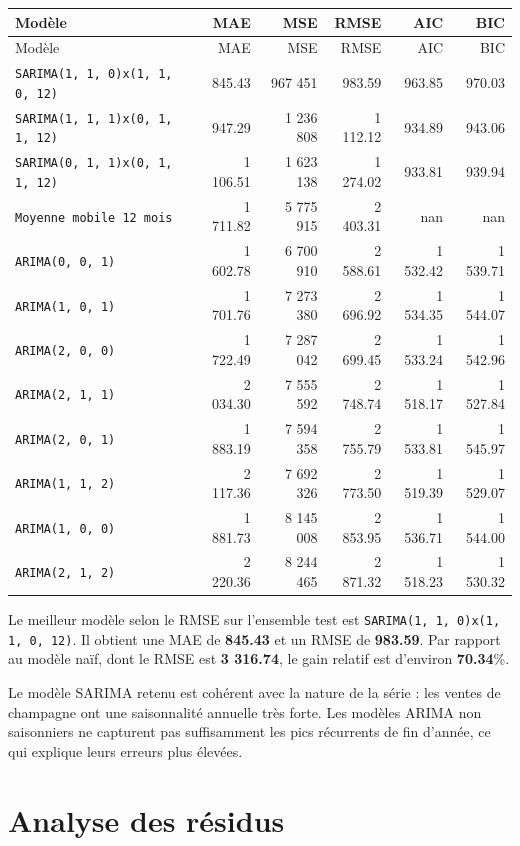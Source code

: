 \documentclass[12pt,a4paper]{report}
\begin{document}
\begin{longtable}{p{6.8cm}rrrrr}
\toprule
Modèle & MAE & MSE & RMSE & AIC & BIC \\
\midrule
\endfirsthead
\toprule
Modèle & MAE & MSE & RMSE & AIC & BIC \\
\midrule
\endhead
\texttt{SARIMA(1, 1, 0)x(1, 1, 0, 12)} & 845.43 & 967 451 & 983.59 & 963.85 & 970.03 \\
\texttt{SARIMA(1, 1, 1)x(0, 1, 1, 12)} & 947.29 & 1 236 808 & 1 112.12 & 934.89 & 943.06 \\
\texttt{SARIMA(0, 1, 1)x(0, 1, 1, 12)} & 1 106.51 & 1 623 138 & 1 274.02 & 933.81 & 939.94 \\
\texttt{Moyenne mobile 12 mois} & 1 711.82 & 5 775 915 & 2 403.31 & nan & nan \\
\texttt{ARIMA(0, 0, 1)} & 1 602.78 & 6 700 910 & 2 588.61 & 1 532.42 & 1 539.71 \\
\texttt{ARIMA(1, 0, 1)} & 1 701.76 & 7 273 380 & 2 696.92 & 1 534.35 & 1 544.07 \\
\texttt{ARIMA(2, 0, 0)} & 1 722.49 & 7 287 042 & 2 699.45 & 1 533.24 & 1 542.96 \\
\texttt{ARIMA(2, 1, 1)} & 2 034.30 & 7 555 592 & 2 748.74 & 1 518.17 & 1 527.84 \\
\texttt{ARIMA(2, 0, 1)} & 1 883.19 & 7 594 358 & 2 755.79 & 1 533.81 & 1 545.97 \\
\texttt{ARIMA(1, 1, 2)} & 2 117.36 & 7 692 326 & 2 773.50 & 1 519.39 & 1 529.07 \\
\texttt{ARIMA(1, 0, 0)} & 1 881.73 & 8 145 008 & 2 853.95 & 1 536.71 & 1 544.00 \\
\texttt{ARIMA(2, 1, 2)} & 2 220.36 & 8 244 465 & 2 871.32 & 1 518.23 & 1 530.32 \\
\bottomrule
\end{longtable}

Le meilleur modèle selon le RMSE sur l'ensemble test est \texttt{SARIMA(1, 1, 0)x(1, 1, 0, 12)}. Il obtient une MAE de \textbf{845.43} et un RMSE de \textbf{983.59}. Par rapport au modèle naïf, dont le RMSE est \textbf{3 316.74}, le gain relatif est d'environ \textbf{70.34}\%.

Le modèle SARIMA retenu est cohérent avec la nature de la série : les ventes de champagne ont une saisonnalité annuelle très forte. Les modèles ARIMA non saisonniers ne capturent pas suffisamment les pics récurrents de fin d'année, ce qui explique leurs erreurs plus élevées.

\section{Analyse des résidus}
\end{document}
